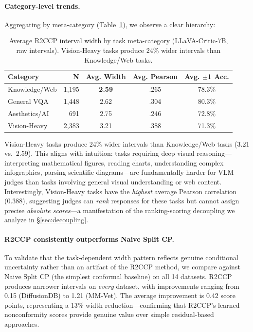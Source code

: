 \documentclass{article}
\begin{document}
\paragraph{Category-level trends.} Aggregating by meta-category (Table~\ref{tab:category}), we observe a clear hierarchy:

\begin{table}[t]
\centering
\caption{Average R2CCP interval width by task meta-category (LLaVA-Critic-7B, raw intervals). Vision-Heavy tasks produce 24\% wider intervals than Knowledge/Web tasks.}
\label{tab:category}
\small
\begin{tabular}{lrccc}
\toprule
\textbf{Category} & \textbf{N} & \textbf{Avg. Width} & \textbf{Avg. Pearson} & \textbf{Avg. $\pm$1 Acc.} \\
\midrule
Knowledge/Web & 1,195 & \textbf{2.59} & .265 & 78.3\% \\
General VQA & 1,448 & 2.62 & .304 & 80.3\% \\
Aesthetics/AI & 691 & 2.75 & .246 & 72.8\% \\
Vision-Heavy & 2,383 & 3.21 & .388 & 71.3\% \\
\bottomrule
\end{tabular}
\end{table}

Vision-Heavy tasks produce 24\% wider intervals than Knowledge/Web tasks (3.21 vs.\ 2.59). This aligns with intuition: tasks requiring deep visual reasoning---interpreting mathematical figures, reading charts, understanding complex infographics, parsing scientific diagrams---are fundamentally harder for VLM judges than tasks involving general visual understanding or web content. Interestingly, Vision-Heavy tasks have the \emph{highest} average Pearson correlation (0.388), suggesting judges can \emph{rank} responses for these tasks but cannot assign precise \emph{absolute scores}---a manifestation of the ranking-scoring decoupling we analyze in \S\ref{sec:decoupling}.

\paragraph{R2CCP consistently outperforms Naive Split CP.} To validate that the task-dependent width pattern reflects genuine conditional uncertainty rather than an artifact of the R2CCP method, we compare against Naive Split CP (the simplest conformal baseline) on all 14 datasets. R2CCP produces narrower intervals on \emph{every} dataset, with improvements ranging from 0.15 (DiffusionDB) to 1.21 (MM-Vet). The average improvement is 0.42 score points, representing a 13\% width reduction---confirming that R2CCP's learned nonconformity scores provide genuine value over simple residual-based approaches.
\end{document}
